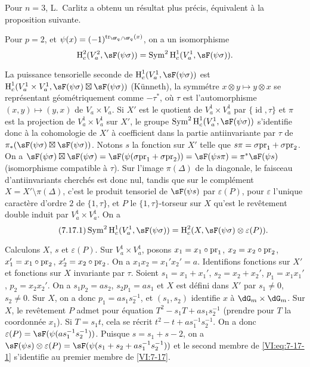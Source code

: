 Pour $n=3$, L.\ Carlitz \cite{ca69-2} a obtenu un r\'esultat plus pr\'ecis, 
\'equivalent \`a la proposition suivante. 





\begin{proposition_}\label{VI:7-17}
Pour $p=2$, et $\psi(x)=(-1)^{\tr_{\dF_q/\dF_q}(x)}$, on a un isomorphisme 
\[
  \h_c^2(V_a^2,\sF(\psi\sigma)) = \operatorname{Sym}^2 \h_c^1(V_a^1,\sF(\psi\sigma)) \text{.} 
\]
\end{proposition_}

La puissance tensorielle seconde de $\h_c^1(V_a^1,\sF(\psi\sigma))$ est 
$\h_c^1(V_a^1\times V_a^1,\sF(\psi\sigma)\boxtimes \sF(\psi\sigma))$ 
(K\"unneth), la symm\'etre $x\otimes y\mapsto y\otimes x$ se repr\'esentant 
g\'eom\'etriquement comme $-\tau^\ast$, o\`u $\tau$ est l'automorphisme 
$(x,y)\mapsto (y,x)$ de $V_a\times V_a$. Si $X'$ est le quotient de 
$V_a^1\times V_a^1$ par $\{\operatorname{id}{},\tau\}$ et $\pi$ est la 
projection de $V_a^1\times V_a^1$ sur $X'$, le groupe 
$\operatorname{Sym}^2 \h_c^1(V_a^1,\sF(\psi\sigma))$ s'identifie donc \`a la 
cohomologie de $X'$ \`a coefficient dans la partie antiinvariante par $\tau$ de 
$\pi_\ast(\sF(\psi\sigma)\boxtimes \sF(\psi\sigma))$. Notons $s$ la fonction 
sur $X'$ telle que $s\pi =\sigma\mathrm{pr}_1+\sigma\mathrm{pr}_2$. On a 
$\sF(\psi\sigma)\boxtimes \sF(\psi\sigma) = \sF(\psi(\sigma\pr_1+\sigma\pr_2)) = \sF(\psi s \pi) = \pi^\ast \sF(\psi s)$ 
(isomorphisme compatible \`a $\tau$). Sur l'image $\pi(\Delta)$ de la 
diagonale, le faisceau d'antiinvariants cherch\'es est donc nul, tandis que sur 
le compl\'ement $X=X'\setminus \pi(\Delta)$, c'est le produit tensoriel de 
$\sF(\psi s)$ par $\varepsilon(P)$, pour $\varepsilon$ l'unique caract\`ere 
d'ordre $2$ de $\{1,\tau\}$, et $P$ le $\{1,\tau\}$-torseur sur $X$ qu'est le 
rev\^etement double induit par $V_a^1\times V_a^1$. On a 
\begin{equation*}\tag{7.17.1}\label{VI:eq:7-17-1}
  \operatorname{Sym}^2 \h_c^1(V_a^1,\sF(\psi\sigma)) = \h_c^2(X,\sF(\psi\sigma)\otimes \varepsilon(P)) \text{.}
\end{equation*}

Calculons $X$, $s$ et $\varepsilon(P)$. Sur $V_a^1\times V_a^1$, posons 
$x_1=x_1\circ\mathrm{pr}_1$, $x_2=x_2\circ\mathrm{pr}_2$, $x_1'=x_1\circ \mathrm{pr}_2$, 
$x_2'=x_2\circ \mathrm{pr}_2$. On a $x_1 x_2=x_1'x_2'=a$. Identifions fonctions sur 
$X'$ et fonctions sur $X$ invariante par $\tau$. Soient $s_1=x_1+x_1'$, 
$s_2=x_2+x_2'$, $p_1=x_1 x_1'$, $p_2=x_2 x_2'$. On a $s_1 p_2 = a s_2$, 
$s_2 p_1 = a s_1$ et $X$ est d\'efini dans $X'$ par $s_1\ne 0$, $s_2\ne 0$. Sur 
$X$, on a donc $p_1 = a s_1 s_2^{-1}$, et $(s_1,s_2)$ identifie $x$ \`a 
$\dG_m\times \dG_m$. Sur $X$, le rev\^etement $P$ admet pour \'equation 
$T^2-s_1 T+a s_1 s_2^{-1}$ (prendre pour $T$ la coordonn\'ee $x_1$). Si 
$T=s_1 t$, cela se r\'ecrit $t^2-t+a s_1^{-1} s_2^{-1}$. On a donc 
$\varepsilon(P) = \sF(\psi(a s_1^{-1} s_2^{-1}))$. Puisque $s=s_1+s-2$, on a 
$\sF(\psi s)\otimes \varepsilon(P) = \sF(\psi(s_1+s_2+ a s_1^{-1} s_2^{-1}))$ 
et le second membre de \eqref{VI:eq:7-17-1} s'identifie au premier membre de 
\ref{VI:7-17}. 


